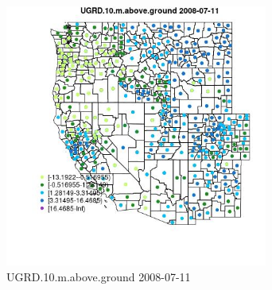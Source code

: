 \begin{figure} 
\centering  
\includegraphics[width=0.77\textwidth]{Code_Outputs/df_report_ML_predictors_CountyCentroid_Locations_Dates_2008-01-01to2018-12-31_MapObsUGRD10maboveground2008-07-11.jpg} 
\caption{\label{fig:df_report_ML_predictors_CountyCentroid_Locations_Dates_2008-01-01to2018-12-31MapObsUGRD10maboveground2008-07-11}UGRD.10.m.above.ground 2008-07-11} 
\end{figure} 
 
